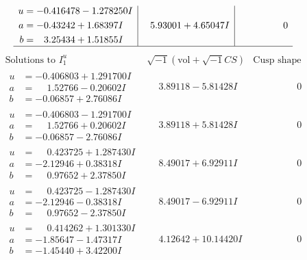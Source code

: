 \documentclass[1p]{elsarticle_modified}
\theoremstyle{definition}
\newcommand{\I}{\sqrt{-1}}
\begin{document}
$$\begin{array}{c|c|c}
\begin{aligned}
u &= -0.416478 - 1.278250 I \\
a &= -0.43242 + 1.68397 I \\
b &= \phantom{-}3.25434 + 1.51855 I\end{aligned}
 & \phantom{-}5.93001 + 4.65047 I & \phantom{-0.000000 } 0\\
 \hline 
 \end{array}$$\newpage$$\begin{array}{c|c|c}  
\text{Solutions to }I^u_{1}& \I (\text{vol} + \sqrt{-1}CS) & \text{Cusp shape}\\
 \hline 
\begin{aligned}
u &= -0.406803 + 1.291700 I \\
a &= \phantom{-}1.52766 - 0.20602 I \\
b &= -0.06857 + 2.76086 I\end{aligned}
 & \phantom{-}3.89118 - 5.81428 I & \phantom{-0.000000 } 0 \\ \hline\begin{aligned}
u &= -0.406803 - 1.291700 I \\
a &= \phantom{-}1.52766 + 0.20602 I \\
b &= -0.06857 - 2.76086 I\end{aligned}
 & \phantom{-}3.89118 + 5.81428 I & \phantom{-0.000000 } 0 \\ \hline\begin{aligned}
u &= \phantom{-}0.423725 + 1.287430 I \\
a &= -2.12946 + 0.38318 I \\
b &= \phantom{-}0.97652 + 2.37850 I\end{aligned}
 & \phantom{-}8.49017 + 6.92911 I & \phantom{-0.000000 } 0 \\ \hline\begin{aligned}
u &= \phantom{-}0.423725 - 1.287430 I \\
a &= -2.12946 - 0.38318 I \\
b &= \phantom{-}0.97652 - 2.37850 I\end{aligned}
 & \phantom{-}8.49017 - 6.92911 I & \phantom{-0.000000 } 0 \\ \hline\begin{aligned}
u &= \phantom{-}0.414262 + 1.301330 I \\
a &= -1.85647 - 1.47317 I \\
b &= -1.45440 + 3.42200 I\end{aligned}
 & \phantom{-}4.12642 + 10.14420 I & \phantom{-0.000000 } 0 \\ \hline\begin{aligned}

\end{aligned}
\end{array}$$
\end{document}
